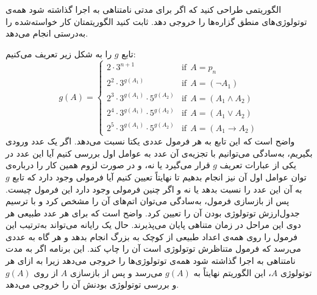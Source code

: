 الگوریتمی طراحی کنید که اگر برای مدتی نامتناهی به اجرا گذاشته شود همه‌ی توتولوژی‌های منطق گزاره‌ها را خروجی دهد. ثابت کنید الگوریتمتان کار خواسته‌شده را به‌درستی انجام می‌دهد.
\begin{ans}
تابع $g$ را به شکل زیر تعریف می‌کنیم:
$$
g(A)=
\begin{cases}
2\cdot 3^{n+1} & \text{if}~~A = p_n\\
2^2\cdot 3^{g(A_1)} & \text{if}~~A=(\neg A_1)\\
2^3\cdot 3^{g(A_1)}\cdot 5^{g(A_2)} & \text{if}~~A=(A_1\wedge A_2) \\
2^4\cdot 3^{g(A_1)}\cdot 5^{g(A_2)} & \text{if}~~A=(A_1\vee A_2) \\
2^5\cdot 3^{g(A_1)}\cdot 5^{g(A_2)} & \text{if}~~A=(A_1\rightarrow A_2)
\end{cases}
$$
واضح است که این تابع به هر فرمول عددی یکتا نسبت می‌دهد. اگر یک عدد ورودی بگیریم، به‌سادگی می‌توانیم با تجزیه‌ی آن عدد به عوامل اول بررسی کنیم آیا این عدد در یکی از عبارات تعریف $g$ قرار می‌گیرد یا نه، و در صورت لزوم همین کار را درباره‌ی توان عوامل اول آن نیز انجام بدهیم تا نهایتاً تعیین کنیم آیا فرمولی وجود دارد که تابع $g$ به آن این عدد را نسبت بدهد یا نه و اگر چنین فرمولی وجود دارد این فرمول چیست. پس از بازسازی فرمول، به‌سادگی می‌توان اتم‌های آن را مشخص کرد و با ترسیم جدول‌ارزش توتولوژی بودن آن را تعیین کرد. واضح است که برای هر عدد طبیعی هر دوی این مراحل در زمان متناهی پایان می‌پذیرند. حال یک رایانه می‌تواند به‌ترتیب این فرمول را روی همه‌ی اعداد طبیعی از کوچک به بزرگ انجام بدهد و هر گاه به عددی می‌رسد که فرمول متناظرش توتولوژی است آن را چاپ کند. این برنامه اگر به مدت نامتناهی به اجرا گذاشته شود همه‌ی توتولوژی‌ها را خروجی می‌دهد زیرا به ازای هر توتولوژی $A$، این الگوریتم نهایتاً به
$g(A)$
می‌رسد و پس از بازسازی $A$ از روی $g(A)$ و بررسی توتولوژی بودنش آن را خروجی می‌دهد.
\end{ans}